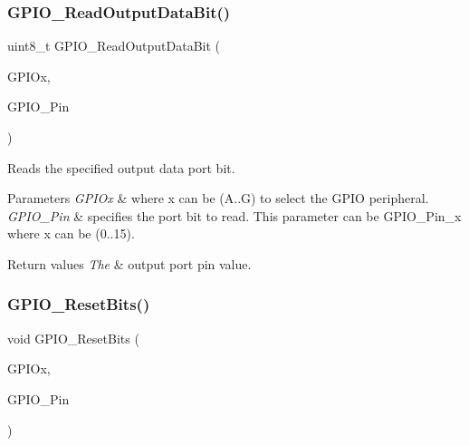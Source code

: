 \subsubsection{\texorpdfstring{GPIO\_ReadOutputDataBit()}{GPIO\_ReadOutputDataBit()}}
{\footnotesize\ttfamily uint8\+\_\+t G\+P\+I\+O\+\_\+\+Read\+Output\+Data\+Bit (\begin{DoxyParamCaption}\item[{\mbox{\hyperlink{struct_g_p_i_o___type_def}{G\+P\+I\+O\+\_\+\+Type\+Def}} $\ast$}]{G\+P\+I\+Ox,  }\item[{uint16\+\_\+t}]{G\+P\+I\+O\+\_\+\+Pin }\end{DoxyParamCaption})}



Reads the specified output data port bit. 


\begin{DoxyParams}{Parameters}
{\em G\+P\+I\+Ox} & where x can be (A..G) to select the G\+P\+IO peripheral. \\
\hline
{\em G\+P\+I\+O\+\_\+\+Pin} & specifies the port bit to read. This parameter can be G\+P\+I\+O\+\_\+\+Pin\+\_\+x where x can be (0..15). \\
\hline
\end{DoxyParams}

\begin{DoxyRetVals}{Return values}
{\em The} & output port pin value. \\
\hline
\end{DoxyRetVals}
\mbox{\label{group___g_p_i_o___private___functions_ga6fcd35b207a66608dd2c9d7de9247dc8}} 
\subsubsection{\texorpdfstring{GPIO\_ResetBits()}{GPIO\_ResetBits()}}
{\footnotesize\ttfamily void G\+P\+I\+O\+\_\+\+Reset\+Bits (\begin{DoxyParamCaption}\item[{\mbox{\hyperlink{struct_g_p_i_o___type_def}{G\+P\+I\+O\+\_\+\+Type\+Def}} $\ast$}]{G\+P\+I\+Ox,  }\item[{uint16\+\_\+t}]{G\+P\+I\+O\+\_\+\+Pin }\end{DoxyParamCaption})}



